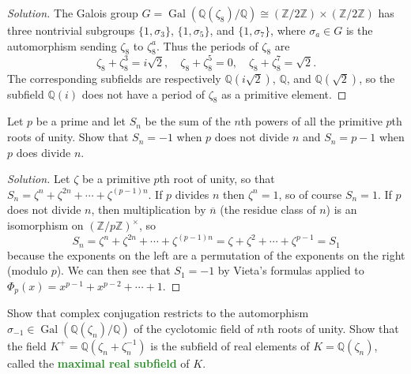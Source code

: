 \documentclass[10pt]{article}
\providecommand{\ol}{\overline}
\providecommand{\Gal}{\operatorname{Gal}}
\providecommand{\QQ}{\mathbb Q}
\providecommand{\ZZ}{\mathbb Z}
\providecommand{\inv}{^{-1}}
\newenvironment{soln}{\begin{proof}[Solution]}{\end{proof}}
\providecommand{\vocab}[1]{{\textbf{\textcolor{ForestGreen}{#1}}}}
\begin{document}
\begin{soln}
    The Galois group
    $G = \Gal(\QQ(\zeta_8)/\QQ)\cong(\ZZ/2\ZZ)\times(\ZZ/2\ZZ)$
    has three nontrivial subgroups $\{1,\sigma_3\}$,
    $\{1,\sigma_5\}$, and $\{1,\sigma_7\}$,
    where $\sigma_a\in G$ is the automorphism sending
    $\zeta_8$ to $\zeta_8^a$. Thus the periods of $\zeta_8$ are
    \begin{equation*}
        \zeta_8 + \zeta_8^3 = i\sqrt 2,\quad
	\zeta_8 + \zeta_8^5 = 0,\quad
	\zeta_8 + \zeta_8^7 = \sqrt 2.
    \end{equation*}
    The corresponding subfields are respectively
    $\QQ(i\sqrt 2)$, $\QQ$, and $\QQ(\sqrt 2)$,
    so the subfield $\QQ(i)$ does not have a period of $\zeta_8$
    as a primitive element.
\end{soln}

\begin{problem}
    [\S14.5\#5]
    Let $p$ be a prime and let $S_n$ be the sum
    of the $n$th powers of all the primitive $p$th roots of unity.
    Show that $S_n = -1$ when $p$ does not divide $n$
    and $S_n = p-1$ when $p$ does divide $n$.
\end{problem}

\begin{soln}
    Let $\zeta$ be a primitive $p$th root of unity, so that
    $S_n = \zeta^n + \zeta^{2n} + \cdots + \zeta^{(p-1)n}$.
    If $p$ divides $n$ then $\zeta^n = 1$, so of course $S_n = 1$.
    If $p$ does not divide $n$, then
    multiplication by $\ol n$ (the residue class of $n$)
    is an isomorphism on $(\ZZ/p\ZZ)^\times$, so
    \begin{equation*}
	S_n = \zeta^n + \zeta^{2n} + \cdots + \zeta^{(p-1)n}
	= \zeta + \zeta^2 + \cdots + \zeta^{p-1} = S_1
    \end{equation*}
    because the exponents on the left are a permutation
    of the exponents on the right (modulo $p$).
    We can then see that $S_1 = -1$ by Vieta's formulas applied to
    $\Phi_p(x) = x^{p-1} + x^{p-2} + \cdots + 1$.
\end{soln}

\begin{problem}
    [\S14.5\#7]
    Show that complex conjugation restricts to the automorphism
    $\sigma_{-1}\in\Gal(\QQ(\zeta_n)/\QQ)$ of
    the cyclotomic field of $n$th roots of unity.
    Show that the field $K^+ = \QQ(\zeta_n + \zeta_n\inv)$
    is the subfield of real elements of $K = \QQ(\zeta_n)$,
    called the \vocab{maximal real subfield} of $K$.
\end{problem}
\end{document}
